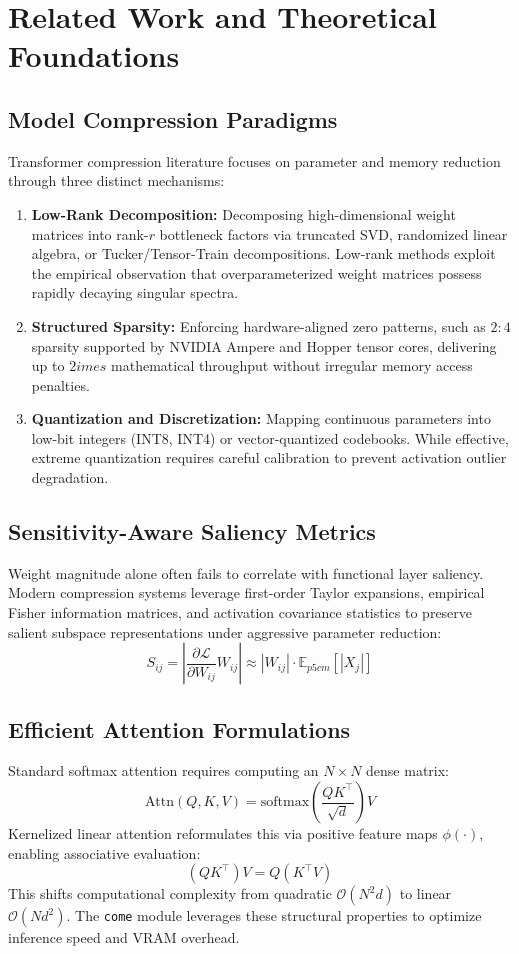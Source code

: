 \section{Related Work and Theoretical Foundations}

\subsection{Model Compression Paradigms}
Transformer compression literature focuses on parameter and memory reduction through three distinct mechanisms:
\begin{enumerate}
\item \textbf{Low-Rank Decomposition:} Decomposing high-dimensional weight matrices into rank-$r$ bottleneck factors via truncated SVD, randomized linear algebra, or Tucker/Tensor-Train decompositions. Low-rank methods exploit the empirical observation that overparameterized weight matrices possess rapidly decaying singular spectra.
\item \textbf{Structured Sparsity:} Enforcing hardware-aligned zero patterns, such as $2:4$ sparsity supported by NVIDIA Ampere and Hopper tensor cores, delivering up to $2	imes$ mathematical throughput without irregular memory access penalties.
\item \textbf{Quantization and Discretization:} Mapping continuous parameters into low-bit integers (INT8, INT4) or vector-quantized codebooks. While effective, extreme quantization requires careful calibration to prevent activation outlier degradation.
\end{enumerate}

\subsection{Sensitivity-Aware Saliency Metrics}
Weight magnitude alone often fails to correlate with functional layer saliency. Modern compression systems leverage first-order Taylor expansions, empirical Fisher information matrices, and activation covariance statistics to preserve salient subspace representations under aggressive parameter reduction:
\[
S_{ij} = \left| \frac{\partial \mathcal{L}}{\partial W_{ij}} W_{ij} \right| \approx |W_{ij}| \cdot \mathbb{E}_{p{5cm}}[|X_j|]
\]

\subsection{Efficient Attention Formulations}
Standard softmax attention requires computing an $N \times N$ dense matrix:
\[
\text{Attn}(Q, K, V) = \text{softmax}\left(\frac{Q K^\top}{\sqrt{d}}\right) V
\]
Kernelized linear attention reformulates this via positive feature maps $\phi(\cdot)$, enabling associative evaluation:
\[
(Q K^\top) V = Q (K^\top V)
\]
This shifts computational complexity from quadratic $\mathcal{O}(N^2 d)$ to linear $\mathcal{O}(N d^2)$. The \texttt{come} module leverages these structural properties to optimize inference speed and VRAM overhead.
